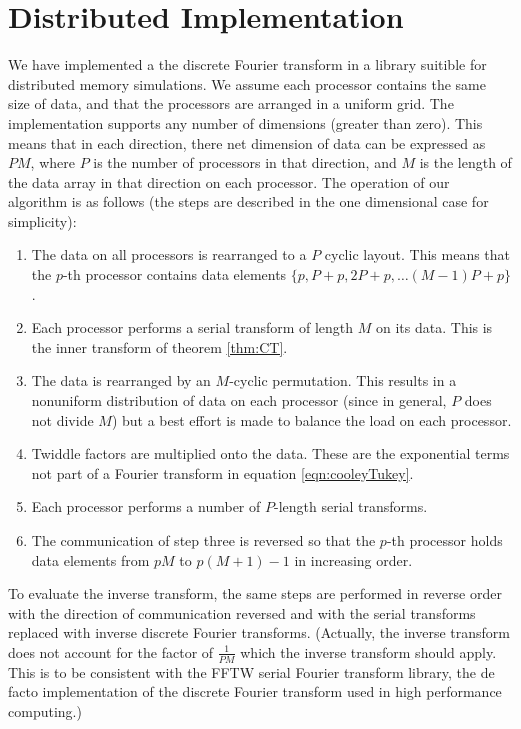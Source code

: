 \documentclass{article}
\theoremstyle{definition}
\begin{document}
\section{Distributed Implementation}
We have implemented a the discrete Fourier transform in a library suitible for
distributed memory simulations. We assume each processor contains the same size
of data, and that the processors are arranged in a uniform grid. The
implementation supports any number of dimensions (greater than zero). This means
that in each direction, there net dimension of data can be expressed as $PM$,
where $P$ is the number of processors in that direction, and $M$ is the length
of the data array in that direction on each processor. The operation of our
algorithm is as follows (the steps are described in the one dimensional case for
simplicity):
\begin{enumerate}
  \item The data on all processors is rearranged to a $P$ cyclic layout. This
means that the $p$-th processor contains data elements $\{p,P+p,2P+p, \dots
(M-1)P + p\}$.
  \item Each processor performs a serial transform of length $M$ on its data.
This is the inner transform of theorem \ref{thm:CT}.
  \item The data is rearranged by an $M$-cyclic permutation. This results in a
nonuniform distribution of data on each processor (since in general, $P$ does
not divide $M$) but a best effort is made to balance the load on each processor.
  \item Twiddle factors are multiplied onto the data. These are the exponential
terms not part of a Fourier transform in equation \eqref{eqn:cooleyTukey}.
  \item Each processor performs a number of $P$-length serial transforms.
  \item The communication of step three is reversed so that the $p$-th processor
holds data elements from $pM$ to $p(M+1) - 1$ in increasing order.
\end{enumerate}
To evaluate the inverse transform, the same steps are performed in reverse
order with the direction of communication reversed and with the serial
transforms replaced with inverse discrete Fourier transforms. (Actually, the
inverse transform does not account for the factor of $\frac{1}{PM}$ which the
inverse transform should apply. This is to be consistent with the FFTW serial
Fourier transform library, the de facto implementation of the discrete Fourier
transform used in high performance computing.)
\end{document}
